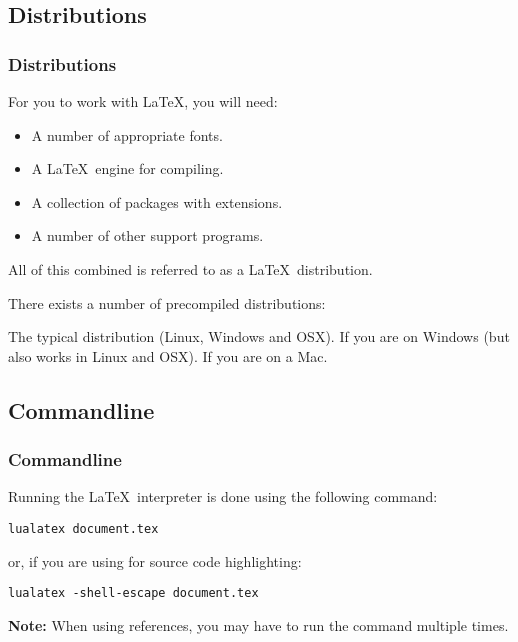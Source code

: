 {\subsection{Distributions}
\begin{frame}[fragile]
  \frametitle{Distributions}
  \vspace{3mm}
  For you to work with \LaTeX, you will need:
  \begin{itemize}
    \item A number of appropriate fonts.
    \item A \LaTeX\ engine for compiling.
    \item A collection of packages with extensions.
    \item A number of other support programs.
  \end{itemize}
  
  \vspace{5mm}
  All of this combined is referred to as a \LaTeX\ distribution.
  
  \vspace{5mm}
  There exists a number of precompiled distributions:
  \begin{itemize}
     The typical distribution (Linux, Windows and OSX).
     If you are on Windows (but also works in Linux and OSX).
     If you are on a Mac.
  \end{itemize}
\end{frame}

\subsection{Commandline}
\begin{frame}[fragile]
  \frametitle{Commandline}
  \vspace{3mm}
  Running the \LaTeX\ interpreter is done using the following command:
  \begin{verbatim}
lualatex document.tex
  \end{verbatim}
  or, if you are using  for source code highlighting:
  \begin{verbatim}
lualatex -shell-escape document.tex
  \end{verbatim}
  
  \vspace{5mm}
  \textbf{Note:} When using references, you may have to run the command multiple times.
\end{frame}

}
